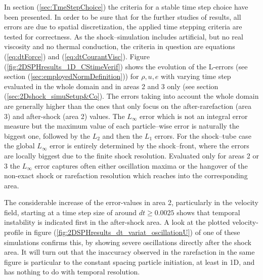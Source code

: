 \documentclass[11pt,a4paper,twoside]{report}
\begin{document}
In section (\ref{sec:TmeStepChoice}) the criteria for a stable time step choice have been presented. In order to be sure that for the further studies of results, all errors are due to spatial discretization, the applied time stepping criteria are tested for correctness. As the shock--simulation includes artificial, but no real viscosity and no thermal conduction, the criteria in question are equations (\ref{eq:dtForce}) and (\ref{eq:dtCourantVisc}). Figure (\ref{fig:2DSPHresults_1D_CStimeVerif}) shows the evolution of the L-errors (see section (\ref{sec:employedNormDefinition})) for $\rho, u, e$ with varying time step evaluated in the whole domain and in areas 2 and 3 only (see section (\ref{sec:2Dshock_simuSetup&Co}). 
The errors taking into account the whole domain are generally higher than the ones that only focus on the after-rarefaction (area 3) and after-shock (area 2) values. The $L_{\infty}$ error which is not an integral error measure but the maximum value of each particle--wise error is naturally the biggest one, followed by the $L_2$ and then the $L_1$ errors. For the shock--tube case the global $L_{\infty}$ error is entirely determined by the shock--front, where the errors are locally biggest due to the finite shock resolution. Evaluated only for areas 2 or 3 the $L_{\infty}$ error captures often either oscillation maxima or the hangover of the non-exact shock or rarefaction resolution %
which reaches into the corresponding area.

The considerable increase of the error-values in area 2, particularly in the velocity field, starting at a time step size of around $dt\geq0.0025$ shows that temporal instability is indicated first in the after-shock area. A look at the plotted velocity-profile in figure (\ref{fig:2DSPHresults_dt_variat_oscillationU}) of one of these simulations confirms this, by showing severe oscillations directly after the shock area. It will turn out that the inaccuracy observed in the rarefaction in the same figure is particular to the constant spacing particle initiation, at least in 1D, and has nothing to do with temporal resolution.
\end{document}
